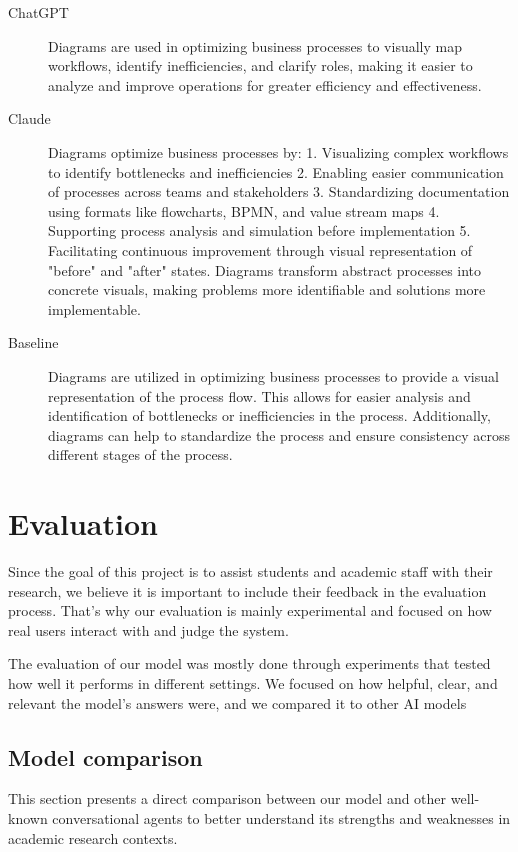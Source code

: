 \documentclass[fleqn,moreauthors,10pt]{ds_report}
\begin{document}
\begin{description}
	\item[ChatGPT] Diagrams are used in optimizing business processes to visually map workflows, identify inefficiencies, and clarify roles, making it easier to analyze and improve operations for greater efficiency and effectiveness.
	\item[Claude] Diagrams optimize business processes by: 1. Visualizing complex workflows to identify bottlenecks and inefficiencies 2. Enabling easier communication of processes across teams and stakeholders 3. Standardizing documentation using formats like flowcharts, BPMN, and value stream maps 4. Supporting process analysis and simulation before implementation 5. Facilitating continuous improvement through visual representation of "before" and "after" states. Diagrams transform abstract processes into concrete visuals, making problems more identifiable and solutions more implementable.
	\item[Baseline] Diagrams are utilized in optimizing business processes to provide a visual representation of the process flow. This allows for easier analysis and identification of bottlenecks or inefficiencies in the process. Additionally, diagrams can help to standardize the process and ensure consistency across different stages of the process.
\end{description}

\section*{Evaluation}

Since the goal of this project is to assist students and academic staff with their research, we believe it is important to include their feedback in the evaluation process. That's why our evaluation is mainly experimental and focused on how real users interact with and judge the system.

The evaluation of our model was mostly done through experiments that tested how well it performs in different settings. We focused on how helpful, clear, and relevant the model’s answers were, and we compared it to other AI models


\subsection*{Model comparison}

This section presents a direct comparison between our model and other well-known conversational agents to better understand its strengths and weaknesses in academic research contexts. 
\end{document}
